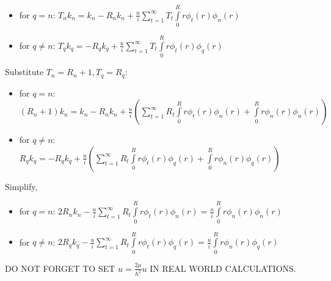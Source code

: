 \documentclass[12pt, a4paper]{article}
\begin{document}
\begin{itemize}
\item for $q = n$: $T_{n} k_n = k_n - R_{n} k_n + \frac{u}{i} \sum\limits_{t = 1}^{\infty} T_{t} \int\limits_{0}^R r \phi_t(r) \phi_n(r)$
\item for $q \ne n$: $T_{q} k_q = -R_{q} k_q + \frac{u}{i} \sum\limits_{t = 1}^\infty T_{t} \int\limits_{0}^R r \phi_t(r) \phi_q(r)$
\end{itemize}

Substitute $T_{n} = R_{n} + 1, T_{q} = R_{q}$:

\begin{itemize}
\item for $q = n$: $(R_{n} + 1) k_n = k_n - R_{n} k_n + \frac{u}{i} (\sum\limits_{t = 1}^{\infty} R_{t} \int\limits_{0}^R r \phi_t(r) \phi_n(r) + \int\limits_{0}^R r \phi_n(r) \phi_n(r))$
\item for $q \ne n$: $R_{q} k_q = -R_{q} k_q + \frac{u}{i} (\sum\limits_{t = 1}^\infty R_{t} \int\limits_{0}^R r \phi_t(r) \phi_q(r) + \int\limits_0^R r \phi_n(r) \phi_q(r))$
\end{itemize}

Simplify,

\begin{itemize}
\item for $q = n$: $2 R_{n} k_n - \frac{u}{i} \sum\limits_{t = 1}^{\infty} R_{t} \int\limits_{0}^R r \phi_t(r) \phi_n(r) =  \frac{u}{i} \int\limits_{0}^R r \phi_n(r) \phi_n(r)$
\item for $q \ne n$: $2 R_q k_q - \frac{u}{i} \sum\limits_{t = 1}^\infty R_{t} \int\limits_{0}^R r \phi_t(r) \phi_q(r) = \frac{u}{i} \int\limits_0^R r \phi_n(r) \phi_q(r)$
\end{itemize}

DO NOT FORGET TO SET $u = \frac{2 \mu}{\hbar^2} u$ IN REAL WORLD CALCULATIONS.
\end{document}

